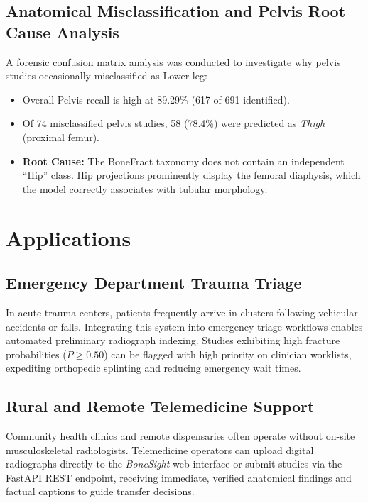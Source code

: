 \documentclass[12pt, a4paper]{report}
\begin{document}
\section{Anatomical Misclassification and Pelvis Root Cause Analysis}
A forensic confusion matrix analysis was conducted to investigate why pelvis studies occasionally misclassified as Lower leg:
\begin{itemize}
    \item Overall Pelvis recall is high at 89.29\% (617 of 691 identified).
    \item Of 74 misclassified pelvis studies, 58 (78.4\%) were predicted as \textit{Thigh} (proximal femur).
    \item \textbf{Root Cause:} The BoneFract taxonomy does not contain an independent ``Hip'' class. Hip projections prominently display the femoral diaphysis, which the model correctly associates with tubular morphology.
\end{itemize}

\newpage
\chapter{Applications}

\section{Emergency Department Trauma Triage}
In acute trauma centers, patients frequently arrive in clusters following vehicular accidents or falls. Integrating this system into emergency triage workflows enables automated preliminary radiograph indexing. Studies exhibiting high fracture probabilities ($P \ge 0.50$) can be flagged with high priority on clinician worklists, expediting orthopedic splinting and reducing emergency wait times.

\section{Rural and Remote Telemedicine Support}
Community health clinics and remote dispensaries often operate without on-site musculoskeletal radiologists. Telemedicine operators can upload digital radiographs directly to the \textit{BoneSight} web interface or submit studies via the FastAPI REST endpoint, receiving immediate, verified anatomical findings and factual captions to guide transfer decisions.
\end{document}
